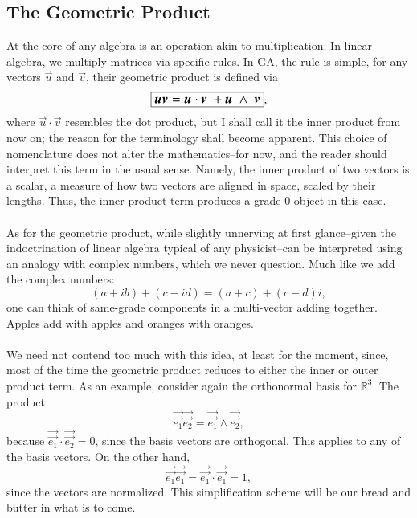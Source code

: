 \subsection{The Geometric Product}

At the core of any algebra is an operation akin to multiplication. In linear algebra, we multiply matrices via specific rules. In GA, the rule is simple, for any vectors $\vec{u}$ and $\vec{v}$, their geometric product is defined via
\begin{equation}
    \large \boxed{\vec{u} \vec{v} = \vec{u} \cdot \vec{v} \ + \vec{u} \ \wedge  \ \vec{v} },
\end{equation}
where $\vec{u} \cdot \vec{v}$ resembles the dot product, but I shall call it the inner product from now on; the reason for the terminology shall become apparent. This choice of nomenclature does not alter the mathematics--for now, and the reader should interpret this term in the usual sense. Namely, the inner product of two vectors is a scalar, a measure of how two vectors are aligned in space, scaled by their lengths. Thus, the inner product term produces a grade-0 object in this case. 
\\ \\
As for the geometric product, while slightly unnerving at first glance--given the indoctrination of linear algebra typical of any physicist--can be interpreted using an analogy with complex numbers, which we never question. Much like we add the complex numbers: 
$$ (a + ib) + (c -id) = (a+c) + (c-d)i , $$
one can think of same-grade components in a multi-vector adding together. Apples add with apples and oranges with oranges.
\\ \\
We need not contend too much with this idea, at least for the moment, since, most of the time the geometric product reduces to either the inner or outer product term. As an example, consider again the orthonormal basis for $\mathbb{R}^3$. The product 
\begin{equation}
   \vec{\vec{e_1}} \vec{\vec{e_2}} = \vec{\vec{e_1}} \wedge \vec{\vec{e_2}},  
\end{equation}
because $\vec{\vec{e_1}} \cdot \vec{\vec{e_2}} = 0$, since the basis vectors are orthogonal. This applies to any of the basis vectors. On the other hand,
\begin{equation}
   \vec{\vec{e_1}} \vec{\vec{e_1}} = \vec{\vec{e_1}} \cdot \vec{\vec{e_1}} = 1, 
\end{equation}
since the vectors are normalized. This simplification scheme will be our bread and butter in what is to come.